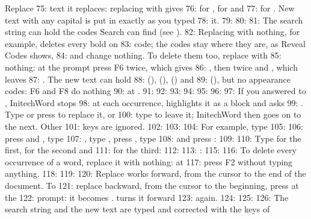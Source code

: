 \begin{Feature}{Replace}
75: text it replaces: replacing  with  gives
76:  for ,  for  and 
77: for .  New text with any capital is put in exactly as you typed
78: it.
79: 
80: 
81: The search string can hold the codes Search can find (see ).
82: Replacing \Code{[BOLD]} with nothing, for example, deletes every bold on
83: code; the \Code{[bold]} codes stay where they are, as Reveal Codes shows,
84: and change nothing.  To delete them too, replace \Code{[bold]} with
85: nothing: at the  prompt press F6 twice, which gives
86: \Code{[BOLD][bold]}, then  twice and , which leaves
87: \Code{[bold]}.  The new text can hold \Code{[Tab]}
88: (),  (), \Code{[HRt]} () and
89: \Code{[HPg]} (), but no appearance codes: F6 and F8 do nothing
90: at .
91: 
92: 
93: 
94: 
95: 
96: 
97: If you answered  to , InitechWord stops
98: at each occurrence, highlights it as a block and asks
99: .  Type  or press  to replace it, or
100: type  to leave it; InitechWord then goes on to the next.  Other
101: keys are ignored.
102: 
103: 
104: For example, type
105: 
106: press  and , type
107: , type , press , type
108:  and press :
109: 
110: Type  for the first,  for the second and
111:  for the third:
112: 
113: : 
115: 
116: To delete every occurrence of a word, replace it with nothing: at
117:  press F2 without typing anything.
118: 
119: 
120: Replace works forward, from the cursor to the end of the document.  To
121: replace backward, from the cursor to the beginning, press  at the
122:  prompt: it becomes .   turns it forward
123: again.
124: 
125: 
126: The search string and the new text are typed and corrected with the keys of

\end{Feature}
